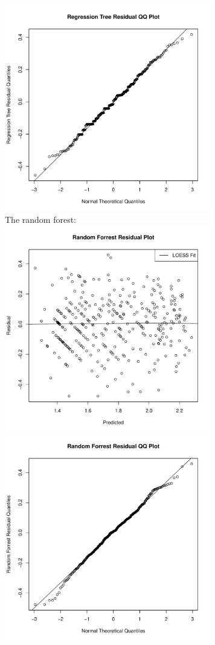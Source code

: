 \documentclass[11pt]{article}
\theoremstyle{definition}
\begin{document}
\begin{itemize}
\begin{itemize}
                    \includegraphics[width=9cm]{hw7/hw7_2_b_rt_qq} \\ 
                The random forest: \\
                    \includegraphics[width=9cm]{hw7/hw7_2_b_rf_res} 
                    \includegraphics[width=9cm]{hw7/hw7_2_b_rf_qq} \\ 


\end{itemize}
\end{itemize}
\end{document}
